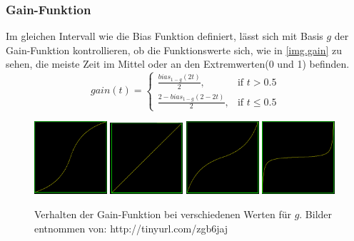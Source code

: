 \subsubsection{Gain-Funktion}
Im gleichen Intervall wie die Bias Funktion definiert, lässt sich mit Basis $g$ der Gain-Funktion kontrollieren, ob die Funktionswerte sich, wie in \autoref{img.gain} zu sehen, die meiste Zeit im Mittel oder an den Extremwerten(0 und 1) befinden.
\[
gain(t)= 
\begin{cases}
\frac{bias_{1-g}(2t)}{2},& \text{if } t>0.5\\
\frac{2-bias_{1-g}(2-2t)}{2},              & \text{if } t\leq0.5
\end{cases}
\]

\begin{figure}[!hbtp]%
	\centering
	{\includegraphics[width=0.24\textwidth]{images/gain025.png}}
	 {\includegraphics[width=0.24\textwidth]{images/gain05.png}}
	 {\includegraphics[width=0.24\textwidth]{images/gain075.png}}
	 {\includegraphics[width=0.24\textwidth]{images/gain097.png}}
	\caption{Verhalten der Gain-Funktion bei verschiedenen Werten für $g$. Bilder entnommen von: http://tinyurl.com/zgb6jaj}\label{img.gain}
\end{figure}


